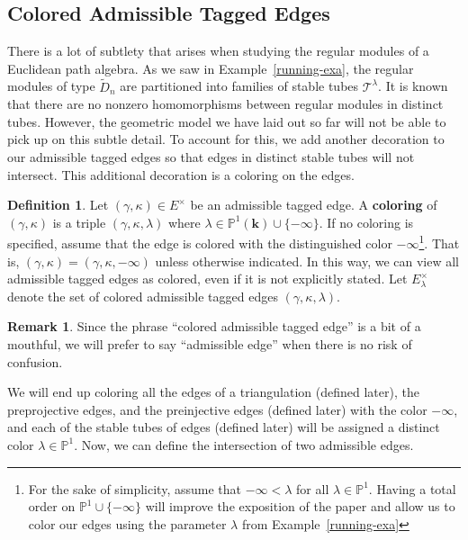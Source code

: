 \documentclass[11pt]{amsart}
\theoremstyle{plain}
\theoremstyle{definition}
\newtheorem{definition}[theorem]{Definition}
\newtheorem{remark}[theorem]{Remark}
\numberwithin{equation}{section}
\renewcommand{\k}{\mathbf{k}}
\begin{document}
\subsection{Colored Admissible Tagged Edges}
There is a lot of subtlety that arises when studying the regular modules of a Euclidean path algebra. 
As we saw in Example~\ref{running-exa}, the regular modules of type $\widetilde{D}_n$ are partitioned into families of stable tubes $\mathcal{T}^\lambda$.
It is known that there are no nonzero homomorphisms between regular modules in distinct tubes.
However, the geometric model we have laid out so far will not be able to pick up on this subtle detail. 
To account for this, we add another decoration to our admissible tagged edges so that edges in distinct stable tubes will not intersect.
This additional decoration is a coloring on the edges.

\begin{definition}\label{def-coloring}
    Let $(\gamma,\kappa) \in E^\times$ be an admissible tagged edge. 
    A \textbf{coloring} of $(\gamma,\kappa)$ is a triple $(\gamma,\kappa,\lambda)$ where $\lambda \in \mathbb{P}^1(\k) \cup \{ -\infty \}$.
    If no coloring is specified, assume that the edge is colored with the distinguished color $-\infty$\footnote{For the sake of simplicity, assume that $-\infty < \lambda$ for all $\lambda\in\mathbb{P}^1$. Having a total order on $\mathbb{P}^1 \cup \{ -\infty \}$ will improve the exposition of the paper and allow us to color our edges using the parameter $\lambda$ from Example~\ref{running-exa}}.
    That is, $(\gamma,\kappa) = (\gamma,\kappa,-\infty)$ unless otherwise indicated.
    In this way, we can view all admissible tagged edges as colored, even if it is not explicitly stated.
    Let $E^\times_\lambda$ denote the set of colored admissible tagged edges $(\gamma,\kappa,\lambda)$.
\end{definition}

\begin{remark}
    Since the phrase ``colored admissible tagged edge'' is a bit of a mouthful, we will prefer to say ``admissible edge'' when there is no risk of confusion.
\end{remark}

We will end up coloring all the edges of a triangulation (defined later), the preprojective edges, and the preinjective edges (defined later) with the color $-\infty$, and each of the stable tubes of edges (defined later) will be assigned a distinct color $\lambda \in \mathbb{P}^1$.
Now, we can define the intersection of two admissible edges.
\end{document}
